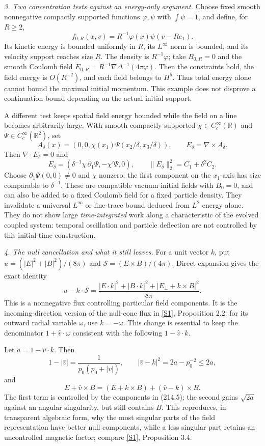 \documentclass[11pt,a4paper]{article}
\newcommand{\R}{\mathbb{R}}
\newcommand{\sref}[2]{\hyperlink{source:#1:#2}{[S#2]}}
\begin{document}
\textit{3. Two concentration tests against an energy-only argument.}
Choose fixed smooth nonnegative compactly supported functions $\varphi,\psi$
with $\int\psi=1$, and define, for $R\ge2$,
\[
 f_{0,R}(x,v)=R^{-1}\varphi(x)\psi(v-Re_1).
\]
Its kinetic energy is bounded uniformly in $R$, its $L^\infty$ norm is
bounded, and its velocity support reaches size $R$. The density is
$R^{-1}\varphi$; take $B_{0,R}=0$ and the smooth Coulomb field
$E_{0,R}=R^{-1}\nabla\Delta^{-1}(4\pi\varphi)$. Then the constraints hold,
the field energy is $O(R^{-2})$, and each field belongs to $H^5$.
Thus total energy alone cannot bound the maximal initial momentum. This
example does not disprove a continuation bound depending on the actual
initial support.

A different test keeps spatial field energy bounded while the field on a
line becomes arbitrarily large. With smooth compactly supported
$\chi\in C_c^\infty(\R)$ and $\Psi\in C_c^\infty(\R^2)$, set
\[
 A_\delta(x)=(0,0,\chi(x_1)\Psi(x_2/\delta,x_3/\delta)),\qquad
 E_\delta=\nabla\times A_\delta.
\]
Then $\nabla\cdot E_\delta=0$ and
\[
 E_\delta=(\delta^{-1}\chi\,\partial_1\Psi,
                    -\chi'\Psi,0),\qquad
 \|E_\delta\|_2^2=C_1+\delta^2 C_2.
\]
Choose $\partial_1\Psi(0,0)\ne0$ and $\chi$ nonzero; the first component
on the $x_1$-axis has size comparable to $\delta^{-1}$. These are compatible
vacuum initial fields with $B_0=0$, and can also be added to a fixed Coulomb
field for a fixed particle density. They invalidate a universal
$L^\infty$ or line-trace bound deduced from $L^2$ energy alone. They do not
show large \emph{time-integrated} work along a characteristic of the evolved
coupled system: temporal oscillation and particle deflection are not
controlled by this initial-time construction.

\textit{4. The null cancellation and what it still leaves.}
For a unit vector $k$, put
$u=(|E|^2+|B|^2)/(8\pi)$ and $\mathcal S=(E\times B)/(4\pi)$.
Direct expansion gives the exact identity
\[
 u-k\cdot\mathcal S
 =\frac{|E\cdot k|^2+|B\cdot k|^2+|E_\perp+k\times B|^2}{8\pi}.
                                                               \tag{214.5}
\]
This is a nonnegative flux controlling particular field components. It is
the incoming-direction version of the null-cone flux in
\sref{30006039}{1}, Proposition 2.2: for its outward radial variable $\omega$,
use $k=-\omega$. This change is essential to keep the denominator
$1+\widehat v\cdot\omega$ consistent with the following $1-\widehat v\cdot k$.

Let $a=1-\widehat v\cdot k$. Then
\[
 1-|\widehat v|=\frac{1}{p_0(p_0+|v|)},\qquad
 |\widehat v-k|^2=2a-p_0^{-2}\le2a,
\]
and
\[
 E+\widehat v\times B=(E+k\times B)+(\widehat v-k)\times B.
                                                               \tag{214.6}
\]
The first term is controlled by the components in (214.5); the second gains
$\sqrt{2a}$ against an angular singularity, but still contains $B$.
This reproduces, in transparent algebraic form, why the most singular
parts of the field representation have better null components, while a
less singular part retains an uncontrolled magnetic factor; compare
\sref{30006039}{1}, Proposition 3.4.
\end{document}
